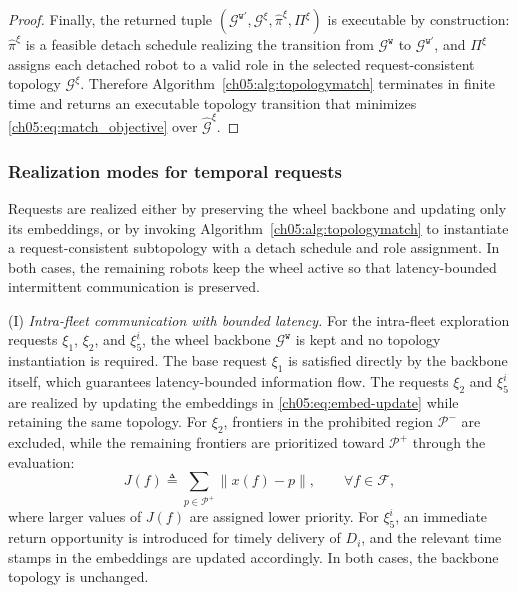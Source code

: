 \begin{proof}
Finally, the returned tuple
\((\mathcal{G}^{\texttt{w}'},\mathcal{G}^{\xi},
\widehat{\pi}^{\xi},\Pi^{\xi})\) is executable by construction:
\(\widehat{\pi}^{\xi}\) is a feasible detach schedule realizing the
transition from \(\mathcal{G}^{\texttt{w}}\) to
\(\mathcal{G}^{\texttt{w}'}\), and \(\Pi^{\xi}\) assigns each detached
robot to a valid role in the selected request-consistent topology
\(\mathcal{G}^{\xi}\). Therefore
Algorithm~\ref{ch05:alg:topologymatch} terminates in finite time and returns
an executable topology transition that minimizes
\eqref{ch05:eq:match_objective} over
\(\widehat{\mathcal{G}}^{\xi}\).
\end{proof}

\subsubsection{Realization modes for temporal requests}
\label{ch05:subsubsec:request_modes}

Requests are realized either by preserving the wheel backbone and updating only
its embeddings, or by invoking Algorithm~\ref{ch05:alg:topologymatch} to
instantiate a request-consistent subtopology with a detach schedule and role
assignment. In both cases, the remaining robots keep the wheel active so that
latency-bounded intermittent communication is preserved.

(I) \emph{Intra-fleet communication with bounded latency.}
For the intra-fleet exploration requests \(\xi_1\), \(\xi_2\), and
\(\xi_5^i\), the wheel backbone \(\mathcal{G}^{\texttt{w}}\) is kept
and no topology instantiation is required. The base request \(\xi_1\) is
satisfied directly by the backbone itself, which guarantees
latency-bounded information flow. The requests \(\xi_2\) and
\(\xi_5^i\) are realized by updating the embeddings in
\eqref{ch05:eq:embed-update} while retaining the same topology.
For \(\xi_2\), frontiers in the prohibited region
\(\mathcal{P}^{-}\) are excluded, while the remaining frontiers are
prioritized toward \(\mathcal{P}^{+}\) through the evaluation:
\begin{equation}
\label{ch05:eq:frontier_weight}
J(f)\triangleq
\sum_{p\in\mathcal{P}^{+}}\|x(f)-p\|,
\qquad \forall f\in\mathcal{F},
\end{equation}
where larger values of \(J(f)\) are assigned lower priority. For
\(\xi_5^i\), an immediate return opportunity is introduced for timely
delivery of \(D_i\), and the relevant time stamps in the embeddings
are updated accordingly. In both cases, the backbone topology is
unchanged.

